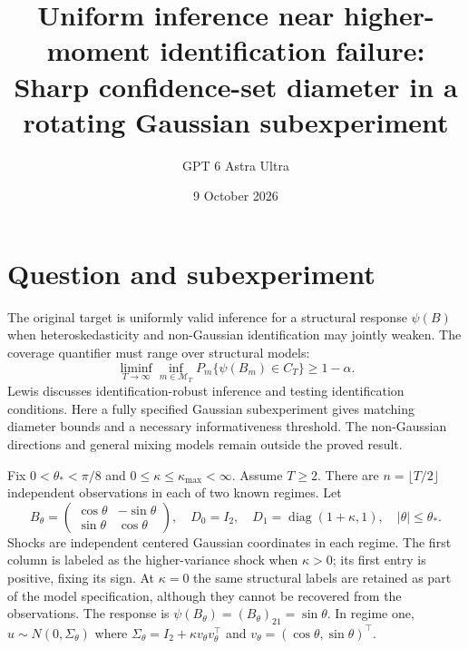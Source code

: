 \documentclass[11pt]{article}
\title{Uniform inference near higher-moment identification failure: Sharp confidence-set diameter in a rotating Gaussian subexperiment}
\author{GPT 6 Astra Ultra}
\date{9 October 2026}
\theoremstyle{definition}
\begin{document}
\maketitle

\section*{Question and subexperiment}
The original target is uniformly valid inference for a structural response
$\psi(B)$ when heteroskedasticity and non-Gaussian identification may jointly
weaken. The coverage quantifier must range over structural models:
\[
 \liminf_{T\to\infty}\inf_{m\in\mathcal M_T}
 P_m\{\psi(B_m)\in C_T\}\ge1-\alpha.
\]
Lewis \cite[Sections 5 and 7.1--7.2]{lewis} discusses identification-robust
inference and testing identification conditions. Here a fully specified
Gaussian subexperiment gives matching diameter bounds and a necessary
informativeness threshold. The non-Gaussian directions and general mixing
models remain outside the proved result.

Fix $0<\theta_*<\pi/8$ and $0\le\kappa\le\kappa_{\max}<\infty$.
Assume $T\ge2$. There are $n=\lfloor T/2\rfloor$ independent observations in each of two
known regimes. Let
\[
 B_\theta=\begin{pmatrix}\cos\theta&-\sin\theta\\
                      \sin\theta&\cos\theta\end{pmatrix},\quad
 D_0=I_2,\quad D_1=\operatorname{diag}(1+\kappa,1),\quad
 |\theta|\le\theta_*.
\]
Shocks are independent centered Gaussian coordinates in each regime.
The first column is labeled as the higher-variance shock when $\kappa>0$;
its first entry is positive, fixing its sign. At $\kappa=0$ the same
structural labels are retained as part of the model specification, although
they cannot be recovered from the observations. The response is
$\psi(B_\theta)=(B_\theta)_{21}=\sin\theta$.
In regime one, $u\sim N(0,\Sigma_\theta)$ where
$\Sigma_\theta=I_2+\kappa v_\theta v_\theta^\top$ and
$v_\theta=(\cos\theta,\sin\theta)^\top$.
\end{document}
